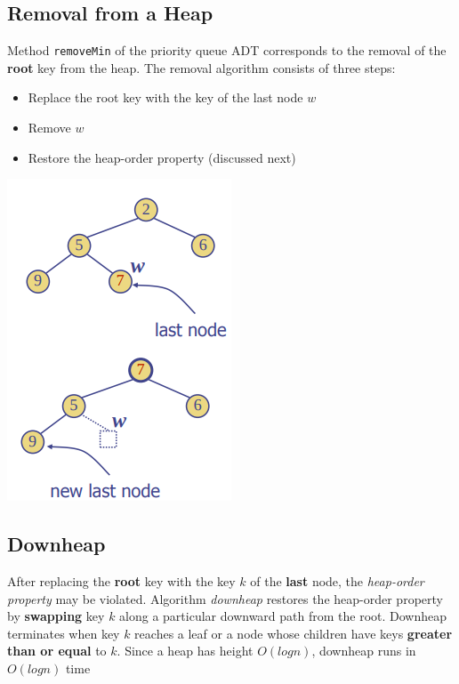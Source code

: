 \documentclass{article}
\begin{document}
\subsection{Removal from a Heap}
\begin{flushleft}
Method \texttt{removeMin} of the priority queue ADT corresponds to the removal of the \textbf{root} key from the heap. The removal algorithm consists of three steps:
\begin{itemize}
	\item Replace the root key with the key of the last node $w$
	\item Remove $w$
	\item Restore the heap-order property (discussed next)
\end{itemize}
\end{flushleft}
\begin{center}
\includegraphics[scale=0.5]{heap_removeMin.png}
\end{center}

\subsection{Downheap}
\begin{flushleft}
After replacing the \textbf{root} key with the key $k$ of the \textbf{last} node, the \textit{heap-order property} may be violated. Algorithm \textit{downheap} restores the heap-order property by \textbf{swapping} key $k$ along a particular downward path from the root. Downheap terminates when key $k$ reaches a leaf or a node whose children have keys \textbf{greater than or equal} to $k$. Since a heap has height $O(log n)$, downheap runs in $O(log n)$ time
\end{flushleft}
\end{document}
